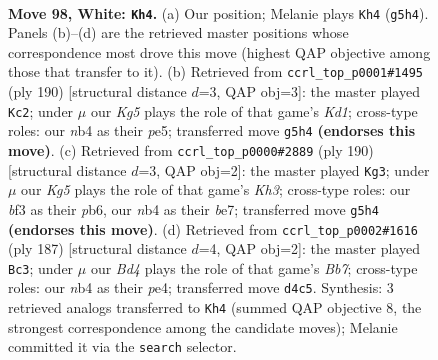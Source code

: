 \documentclass[11pt]{article}
\begin{document}
\clearpage

\begin{figure}[p]\centering
\begin{subfigure}{0.46\textwidth}\centering
\resizebox{\linewidth}{!}{%
\newchessgame
\chessboard[
  setfen={8/7k/8/6K1/1n1B4/5b2/5P2/8 w - - 41 98},
  showmover=false,
  pgfstyle=straightmove, color=movearrow, markmove={g5-h4}
]}
\caption{}
\end{subfigure}\hfill
\begin{subfigure}{0.46\textwidth}\centering
\resizebox{\linewidth}{!}{%
\newchessgame
\chessboard[
  setfen={8/2k5/8/3Bp3/8/4bP2/8/3K4 w - - 13 96},
  showmover=false,
  pgfstyle=straightmove, color=movearrow, markmove={d1-c2}
]}
\caption{}
\end{subfigure}
\\[4pt]
\begin{subfigure}{0.46\textwidth}\centering
\resizebox{\linewidth}{!}{%
\newchessgame
\chessboard[
  setfen={8/4b3/1p6/1P6/2B5/7K/8/6k1 w - - 5 96},
  showmover=false,
  pgfstyle=straightmove, color=movearrow, markmove={h3-g3}
]}
\caption{}
\end{subfigure}\hfill
\begin{subfigure}{0.46\textwidth}\centering
\resizebox{\linewidth}{!}{%
\newchessgame
\chessboard[
  setfen={4B3/8/8/k1K1p3/4P3/8/1b6/8 b - - 11 94},
  showmover=false,
  pgfstyle=straightmove, color=movearrow, markmove={b2-c3}
]}
\caption{}
\end{subfigure}
\caption{\textbf{Move 98, White: \texttt{Kh4}.} (a) Our position; Melanie plays \texttt{Kh4} (\texttt{g5h4}). Panels (b)--(d) are the retrieved master positions whose correspondence most drove this move (highest QAP objective among those that transfer to it). (b) Retrieved from \texttt{ccrl\_top\_p0001\#1495} (ply 190) [structural distance $d$=3, QAP obj=3]: the master played \texttt{Kc2}; under $\mu$ our \emph{Kg5} plays the role of that game's \emph{Kd1}; cross-type roles: our \emph{n}b4 as their \emph{p}e5; transferred move \texttt{g5h4} \textbf{(endorses this move)}. (c) Retrieved from \texttt{ccrl\_top\_p0000\#2889} (ply 190) [structural distance $d$=3, QAP obj=2]: the master played \texttt{Kg3}; under $\mu$ our \emph{Kg5} plays the role of that game's \emph{Kh3}; cross-type roles: our \emph{b}f3 as their \emph{p}b6, our \emph{n}b4 as their \emph{b}e7; transferred move \texttt{g5h4} \textbf{(endorses this move)}. (d) Retrieved from \texttt{ccrl\_top\_p0002\#1616} (ply 187) [structural distance $d$=4, QAP obj=2]: the master played \texttt{Bc3}; under $\mu$ our \emph{Bd4} plays the role of that game's \emph{Bb7}; cross-type roles: our \emph{n}b4 as their \emph{p}e4; transferred move \texttt{d4c5}. Synthesis: 3 retrieved analogs transferred to \texttt{Kh4} (summed QAP objective 8, the strongest correspondence among the candidate moves); Melanie committed it via the \texttt{search} selector.}
\label{fig:thought-m194}
\end{figure}
\end{document}
